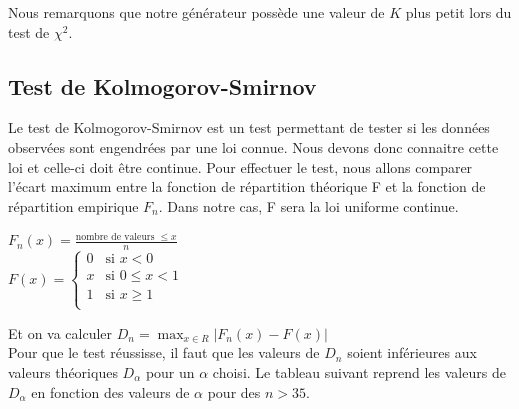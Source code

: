 \documentclass[10pt,a4paper]{article}
\begin{document}
Nous remarquons que notre générateur possède une valeur de $K$ plus petit lors du test de $\chi^2$.

\subsection{Test de Kolmogorov-Smirnov}
Le test de Kolmogorov-Smirnov est un test permettant de tester si les données observées sont engendrées par une loi connue. Nous devons donc connaitre cette loi et celle-ci doit être continue. Pour effectuer le test, nous allons comparer l'écart maximum entre la fonction de répartition théorique F et la fonction de répartition empirique $F_n$. Dans notre cas, F sera la loi uniforme continue.
\begin{center}
 $ F_n(x) = \frac{\text{nombre de valeurs } \leq x}{n}$\\
 $ F(x) =
\left\{
	\begin{array}{lll}
		0  & \mbox{si  } x < 0 \\
		x & \mbox{si  } 0 \leq x < 1 \\
		1 & \mbox{si  } x \geq 1 \\
	\end{array}
\right.
$
\end{center}
Et on va calculer $D_n = \max_{x\in R} |F_n(x)-F(x)|$ \\
Pour que le test réussisse, il faut que les valeurs de $D_n$ soient inférieures aux valeurs théoriques $D_\alpha$ pour un $\alpha$ choisi. Le tableau suivant reprend les valeurs de $D_\alpha$ en fonction des valeurs de $\alpha$ pour des $n > 35$. 
\end{document}
